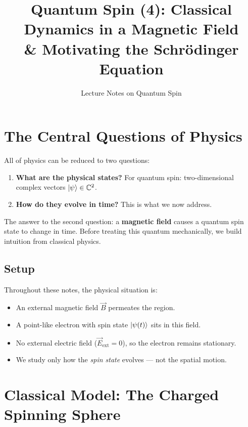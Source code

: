 \documentclass[11pt,a4paper]{article}
\title{\textbf{Quantum Spin (4): Classical Dynamics in a Magnetic Field \\ \& Motivating the Schr\"odinger Equation}}
\author{Lecture Notes on Quantum Spin}
\date{}
\theoremstyle{definition}
\theoremstyle{plain}
\theoremstyle{remark}
\begin{document}
\maketitle
\tableofcontents
\newpage

\section{The Central Questions of Physics}

All of physics can be reduced to two questions:
\begin{enumerate}
    \item \textbf{What are the physical states?} For quantum spin: two-dimensional complex vectors $\ket{\psi} \in \mathbb{C}^2$.
    \item \textbf{How do they evolve in time?} This is what we now address.
\end{enumerate}

The answer to the second question: a \textbf{magnetic field} causes a quantum spin state to change in time. Before treating this quantum mechanically, we build intuition from classical physics.

\subsection{Setup}

Throughout these notes, the physical situation is:
\begin{itemize}
    \item An external magnetic field $\vec{B}$ permeates the region.
    \item A point-like electron with spin state $\ket{\psi(t)}$ sits in this field.
    \item No external electric field ($\vec{E}_{\text{ext}} = 0$), so the electron remains stationary.
    \item We study only how the \emph{spin state} evolves --- not the spatial motion.
\end{itemize}

\section{Classical Model: The Charged Spinning Sphere}
\end{document}
